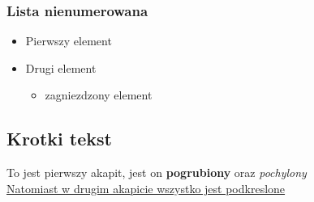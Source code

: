     \subsubsection{Lista nienumerowana}
        \begin{itemize}
            \item Pierwszy element
            \item Drugi element
            \begin{itemize}
                \item zagniezdzony element
            \end{itemize}
        \end{itemize}
\subsection{Krotki tekst}
    To jest pierwszy akapit, jest on \textbf{pogrubiony} oraz \textit{pochylony} \\
    \underline{Natomiast w drugim akapicie wszystko jest podkreslone}